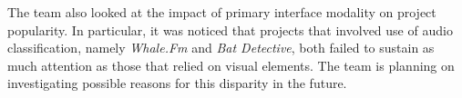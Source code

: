 \documentclass{sigchi}
\begin{document}

The team also looked at the impact of primary interface modality on project popularity.  In particular, it was noticed that projects that involved use of audio classification, namely \emph{Whale.Fm} and \emph{Bat Detective}, both failed to sustain as much attention as those that relied on visual elements.  The team is planning on investigating possible reasons for this disparity in the future.






\end{document}
